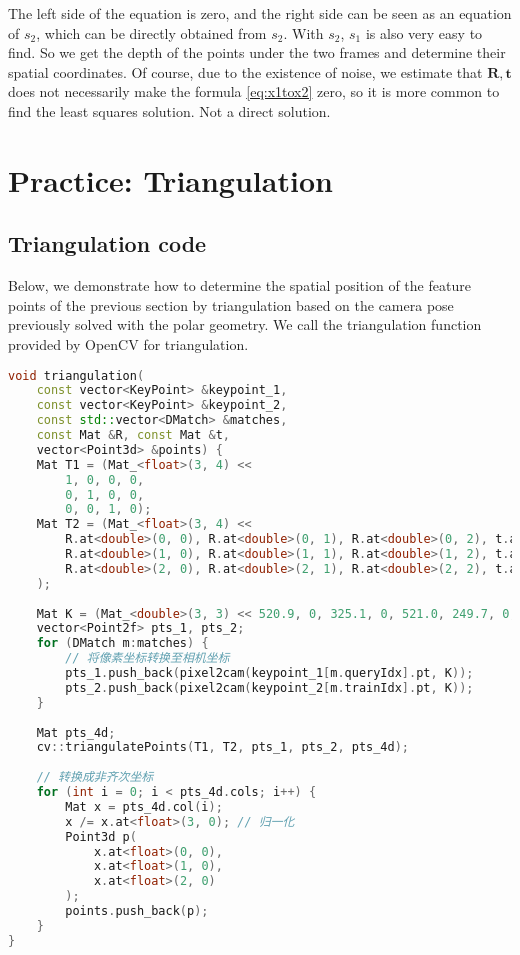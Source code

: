 The left side of the equation is zero, and the right side can be seen as an equation of $s_2$, which can be directly obtained from $s_2$. With $s_2$, $s_1$ is also very easy to find. So we get the depth of the points under the two frames and determine their spatial coordinates. Of course, due to the existence of noise, we estimate that $\bm{R}, \bm{t}$ does not necessarily make the formula \eqref{eq:x1tox2} zero, so it is more common to find the least squares solution. Not a direct solution.

\section{Practice: Triangulation}
\subsection{Triangulation code}
Below, we demonstrate how to determine the spatial position of the feature points of the previous section by triangulation based on the camera pose previously solved with the polar geometry. We call the triangulation function provided by OpenCV for triangulation.
\begin{lstlisting}[language=c++,caption=slambook2/ch7/triangulation.cpp（片段）]
void triangulation(
	const vector<KeyPoint> &keypoint_1,
	const vector<KeyPoint> &keypoint_2,
	const std::vector<DMatch> &matches,
	const Mat &R, const Mat &t,
	vector<Point3d> &points) {
	Mat T1 = (Mat_<float>(3, 4) <<
		1, 0, 0, 0,
		0, 1, 0, 0,
		0, 0, 1, 0);
	Mat T2 = (Mat_<float>(3, 4) <<
		R.at<double>(0, 0), R.at<double>(0, 1), R.at<double>(0, 2), t.at<double>(0, 0),
		R.at<double>(1, 0), R.at<double>(1, 1), R.at<double>(1, 2), t.at<double>(1, 0),
		R.at<double>(2, 0), R.at<double>(2, 1), R.at<double>(2, 2), t.at<double>(2, 0)
	);
	
	Mat K = (Mat_<double>(3, 3) << 520.9, 0, 325.1, 0, 521.0, 249.7, 0, 0, 1);
	vector<Point2f> pts_1, pts_2;
	for (DMatch m:matches) {
		// 将像素坐标转换至相机坐标
		pts_1.push_back(pixel2cam(keypoint_1[m.queryIdx].pt, K));
		pts_2.push_back(pixel2cam(keypoint_2[m.trainIdx].pt, K));
	}
	
	Mat pts_4d;
	cv::triangulatePoints(T1, T2, pts_1, pts_2, pts_4d);
	
	// 转换成非齐次坐标
	for (int i = 0; i < pts_4d.cols; i++) {
		Mat x = pts_4d.col(i);
		x /= x.at<float>(3, 0); // 归一化
		Point3d p(
			x.at<float>(0, 0),
			x.at<float>(1, 0),
			x.at<float>(2, 0)
		);
		points.push_back(p);
	}
}
\end{lstlisting}

